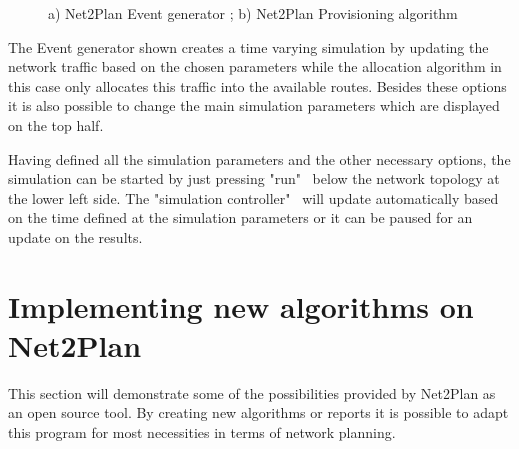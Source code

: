 	\begin{figure}[!h]
		\centering
		\caption{a) Net2Plan Event generator ; b) Net2Plan Provisioning algorithm}
	\end{figure}	

	The Event generator shown creates a time varying simulation by updating the network traffic based on the chosen parameters while the allocation algorithm in this case only allocates this traffic into the available routes. Besides these options it is also possible to change the main simulation parameters which are displayed on the top half.

	Having defined all the simulation parameters and the other necessary options, the simulation can be started by just pressing "run" \ below the network topology at the lower left side. The "simulation controller" \ will update automatically based on the time defined at the simulation parameters or it can be paused for an update on the results.
	
	\newpage

	\section*{Implementing new algorithms on Net2Plan}
	\vspace{1cm}
	This section will demonstrate some of the possibilities provided by Net2Plan as an open source tool. By creating new algorithms or reports it is possible to adapt this program for most necessities in terms of network planning.

